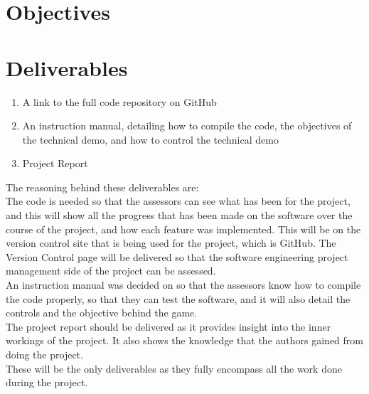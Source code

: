\section{Objectives}


\section{Deliverables}
\begin{enumerate}
	\item A link to the full code repository on GitHub
	\item An instruction manual, detailing how to compile the code, the objectives of the technical demo, and how to control the technical demo
	\item Project Report
\end{enumerate}

The reasoning behind these deliverables are:\\
The code is needed so that the assessors can see what has been for the project, and this will show all the progress that has been made on the software over the course of the project, and how each feature was implemented. This will be on the version control site that is being used for the project, which is GitHub. The Version Control page will be delivered so that the software engineering project management side of the project can be assessed.\\
An instruction manual was decided on so that the assessors know how to compile the code properly, so that they can test the software, and it will also detail the controls and the objective behind the game.\\

The project report should be delivered as it provides insight into the inner workings of the project. It also shows the knowledge that the authors gained from doing the project.\\
These will be the only deliverables as they fully encompass all the work done during the project.\\
